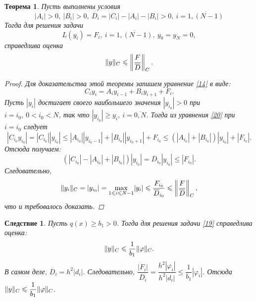 \documentclass[11pt,a4paper,twoside]{report}
\numberwithin{equation}{section}
\theoremstyle{definition}
\theoremstyle{plain}
\newtheorem{theorem}{Теорема}[section]
\newtheorem{cons}{Следствие}[section]
\DeclarePairedDelimiter\norm{\lVert}{\rVert}
\begin{document}
\begin{theorem}
%
    Пусть выполнены условия
    \begin{equation}
        \label{18}
        |A_i|>0,~|B_i|>0,~\overline{D}_i = |C_i| - |A_i| - |B_i| > 0,~i = \overline{1,(N-1)}
    \end{equation}
    Тогда для решения задачи
    \begin{equation}
        \label{19}
        L(y_i)=F_i,~i=\overline{1,(N-1)},~y_0=y_N=0,
    \end{equation}
    справедлива оценка
    $$
        \norm{y}_C \leqslant \left\lVert\dfrac{F}{\overline{D}}\right\rVert_C.
    $$
    \begin{proof}
        Для доказательства этой теоремы запишем уравнение \eqref{14} в виде:
        \begin{equation}
            \label{20}
            C_iy_i=A_iy_{i-1}+B_iy_{i+1}+F_i.
        \end{equation}
        Пусть $|y_i|$ достигает своего наибольшего значения $|y_{i_0}|>0$ при
        $i=i_0,~0<i_0<N$, так что $|y_{i_0}|\geqslant y_i, ~i=\overline{0,N}$.
        Тогда из уравнения \eqref{20} при $i=i_0$ следует
        $$
            |C_{i_0}y_{i_0}|=|C_{i_0}||y_{i_0}| \leqslant
            |A_{i_0}||y_{i_0-1}| + |B_{i_0}||y_{i_0+1}| + F_{i_0} \leqslant
            \left(|A_{i_0}|+|B_{i_0}|\right)|y_{i_0}|+|F_{i_0}|.
        $$
        Отсюда получаем:
        $$
            (|C_{i_0}|-|A_{i_0}|+|B_{i_0}|)|y_{i_0}| =
            \overline{D}_{i_0}|y_{i_0}| \leqslant |F_{i_0}|.
        $$
        Следовательно,
        $$
            \norm{y_i}_C=|y_{i_0}|=\underset{1 \leqslant i \leqslant N-1}\max|y_i| \leqslant
            \dfrac{F_{i_0}}{\overline{D}_{i_0}} \leqslant
            \left\lVert\dfrac{F}{\overline{D}}\right\rVert_C,
        $$
        что и требовалось доказать.
    \end{proof}
%
\end{theorem}
%
\begin{cons}
%
    Пусть $q(x) \geqslant b_1>0$. Тогда для решения задачи \eqref{19}
    справедлива оценка:
    $$
        \norm{y}_C\leqslant\dfrac{1}{b_1}\norm{\varphi}_C.
    $$
    В самом деле, $\overline{D}_i=h^2|d_i|$. Следовательно,
    $\dfrac{|F_i|}{\overline{D}_i} = \dfrac{h^2|\varphi_i|}{h^2|d_i|}
    \leqslant\dfrac{1}{b_1}|\varphi_i|$. Отсюда
    $\norm{y}_C\leqslant\dfrac{1}{b_1}\norm{\varphi}_C$.
%
\end{cons}
%
%
%
%
\end{document}
